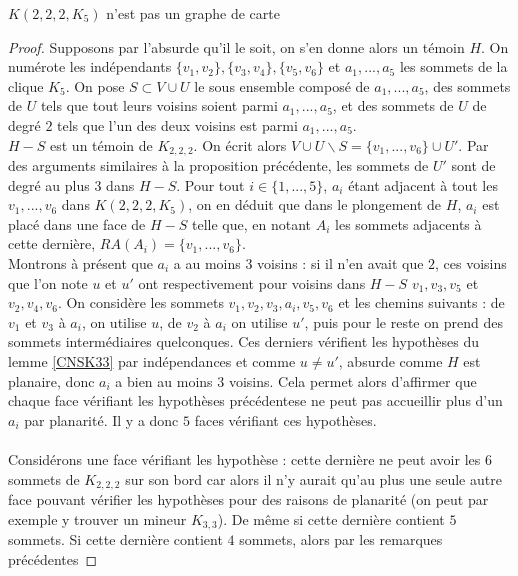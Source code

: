 \documentclass{scrartcl}
\begin{document}
\begin{flushleft}
\begin{prop}\label{K222K5}
    $K(2,2,2,K_5)$ n'est pas un graphe de carte
\end{prop}

\begin{proof}
    Supposons par l'absurde qu'il le soit, on s'en donne alors un témoin $H$. On numérote les indépendants $\{v_1, v_2\}, \{v_3, v_4\}, \{v_5, v_6\}$
    et $a_1, ..., a_5$ les sommets de la clique $K_5$. On pose $S \subset V \cup U$ le sous ensemble composé de $a_1, ..., a_5$, des sommets
    de $U$ tels que tout leurs voisins soient parmi $a_1, ..., a_5$, et des sommets de $U$ de degré $2$ tels que l'un des deux voisins
    est parmi $a_1, ..., a_5$.\\
    $H - S$ est un témoin de $K_{2,2,2}$. On écrit alors $V \cup U \backslash S = \{v_1, ..., v_6\} \cup U'$.
    Par des arguments similaires à la proposition précédente, les sommets de $U'$ sont de degré au plus $3$ dans $H - S$.
    Pour tout $i \in \{1, ..., 5\}$, $a_i$ étant adjacent à tout les $v_1, ..., v_6$ dans $K(2,2,2,K_5)$, on en déduit que dans le plongement
    de $H$, $a_i$ est placé dans une face de $H-S$ telle que, en notant $A_i$ les sommets adjacents à cette dernière, $RA(A_i) = \{v_1, ..., v_6\}$.\\
    Montrons à présent que $a_i$ a au moins $3$ voisins : si il n'en avait que $2$, ces voisins que l'on note
    $u$ et $u'$ ont respectivement pour voisins dans $H - S$ $v_1, v_3, v_5$ et $v_2, v_4, v_6$. On considère les sommets $v_1, v_2, v_3, a_i, v_5, v_6$
    et les chemins suivants : de $v_1$ et $v_3$ à $a_i$, on utilise $u$, de $v_2$ à $a_i$ on utilise $u'$, puis pour le reste on prend des sommets
    intermédiaires quelconques. Ces derniers vérifient les hypothèses du lemme \ref{CNSK33} par indépendances et comme $u \neq u'$, absurde comme $H$
    est planaire, donc $a_i$ a bien au moins $3$ voisins. Cela permet alors d'affirmer que chaque face vérifiant les hypothèses précédentese
    ne peut pas accueillir plus d'un $a_i$ par planarité. Il y a donc $5$ faces vérifiant ces hypothèses.
    \\~\\
    Considérons une face vérifiant les hypothèse : cette dernière ne peut avoir les $6$ sommets de $K_{2,2,2}$ sur son bord car alors il n'y aurait
    qu'au plus une seule autre face pouvant vérifier les hypothèses pour des raisons de planarité (on peut par exemple y trouver un mineur
    $K_{3,3}$). De même si cette dernière contient $5$ sommets. Si cette dernière contient $4$ sommets, alors par les remarques précédentes

\end{proof}
\end{flushleft}
\end{document}
